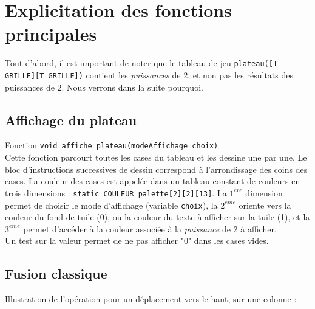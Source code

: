 \documentclass[12pt,a4paper]{article}
\begin{document}
\section{Explicitation des fonctions principales}
Tout d'abord, il est important de noter que le tableau de jeu \texttt{plateau([T GRILLE][T GRILLE])} contient les \emph{puissances} de 2, et non pas les résultats des puissances de 2. Nous verrons dans la suite pourquoi.

\subsection{Affichage du plateau}

Fonction \texttt{void affiche\_plateau(modeAffichage choix)} \\

Cette fonction parcourt toutes les cases du tableau et les dessine une par une.
Le bloc d'instructions successives de dessin correspond à l'arrondissage des coins des cases.
La couleur des cases est appelée dans un tableau constant de couleurs en trois dimensions : \texttt{static COULEUR palette[2][2][13]}.
La $1^{ere}$ dimension permet de choisir le mode d'affichage (variable \texttt{choix}), la $2^{eme}$ oriente vers la couleur du fond de tuile (0), ou la couleur du texte à afficher sur la tuile (1), et la  $3^{eme}$ permet d'accéder à la couleur associée à la \emph{puissance} de 2 à afficher. \\

Un test sur la valeur permet de ne pas afficher "0" dans les cases vides.

\subsection{Fusion classique}

Illustration de l'opération pour un déplacement vers le haut, sur une colonne :
\end{document}

